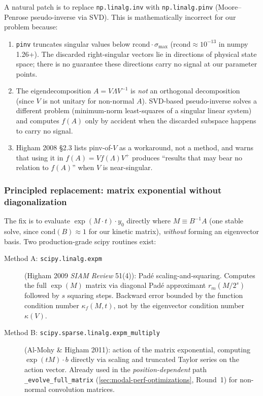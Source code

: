 A natural patch is to replace \texttt{np.linalg.inv} with \texttt{np.linalg.pinv} (Moore--Penrose pseudo-inverse via SVD). This is mathematically incorrect for our problem because:
\begin{enumerate}
  \item \texttt{pinv} truncates singular values below $\mathrm{rcond} \cdot \sigma_\text{max}$ ($\mathrm{rcond} \approx 10^{-13}$ in numpy 1.26+). The discarded right-singular vectors lie in directions of physical state space; there is no guarantee these directions carry no signal at our parameter points.
  \item The eigendecomposition $A = V \Lambda V^{-1}$ is \emph{not} an orthogonal decomposition (since $V$ is not unitary for non-normal $A$). SVD-based pseudo-inverse solves a different problem (minimum-norm least-squares of a singular linear system) and computes $f(A)$ only by accident when the discarded subspace happens to carry no signal.
  \item Higham 2008 \S2.3 lists pinv-of-$V$ as a workaround, not a method, and warns that using it in $f(A) = V f(\Lambda) V^{+}$ produces ``results that may bear no relation to $f(A)$'' when $V$ is near-singular.
\end{enumerate}

\subsubsection{Principled replacement: matrix exponential without diagonalization}
\label{sec:modal-pade-evolution}

The fix is to evaluate $\exp(M \cdot t) \cdot y_0$ directly where $M \equiv B^{-1} A$ (one stable solve, since $\mathrm{cond}(B) \approx 1$ for our kinetic matrix), \emph{without} forming an eigenvector basis. Two production-grade scipy routines exist:
\begin{description}
  \item[Method A: \texttt{scipy.linalg.expm}] (Higham 2009 \emph{SIAM Review} 51(4)): Pad\'{e} scaling-and-squaring. Computes the full $\exp(M)$ matrix via diagonal Pad\'{e} approximant $r_m(M / 2^s)$ followed by $s$ squaring steps. Backward error bounded by the function condition number $\kappa_f(M, t)$, not by the eigenvector condition number $\kappa(V)$.
  \item[Method B: \texttt{scipy.sparse.linalg.expm\_multiply}] (Al-Mohy \& Higham 2011): action of the matrix exponential, computing $\exp(t M) \cdot b$ directly via scaling and truncated Taylor series on the action vector. Already used in the \emph{position-dependent} path \texttt{\_evolve\_full\_matrix} (\cref{sec:modal-perf-optimizations}, Round~1) for non-normal convolution matrices.
\end{description}

